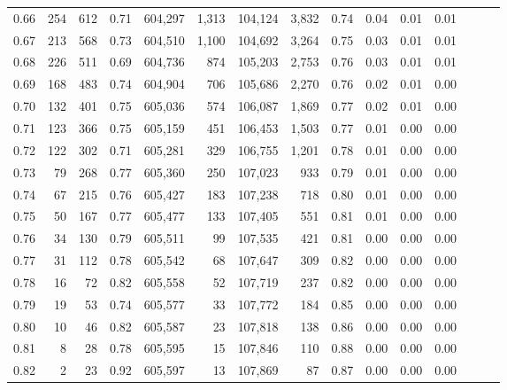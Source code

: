 \begin{tabular}{rrrrrrrrrrrrrrr}
0.66 &     254 &    612 &  0.71 &  604,297 &    1,313 &  104,124 &    3,832 &  0.74 &  0.04 &  0.01 &      0.01 \\
0.67 &     213 &    568 &  0.73 &  604,510 &    1,100 &  104,692 &    3,264 &  0.75 &  0.03 &  0.01 &      0.01 \\
0.68 &     226 &    511 &  0.69 &  604,736 &      874 &  105,203 &    2,753 &  0.76 &  0.03 &  0.01 &      0.01 \\
0.69 &     168 &    483 &  0.74 &  604,904 &      706 &  105,686 &    2,270 &  0.76 &  0.02 &  0.01 &      0.00 \\
0.70 &     132 &    401 &  0.75 &  605,036 &      574 &  106,087 &    1,869 &  0.77 &  0.02 &  0.01 &      0.00 \\
0.71 &     123 &    366 &  0.75 &  605,159 &      451 &  106,453 &    1,503 &  0.77 &  0.01 &  0.00 &      0.00 \\
0.72 &     122 &    302 &  0.71 &  605,281 &      329 &  106,755 &    1,201 &  0.78 &  0.01 &  0.00 &      0.00 \\
0.73 &      79 &    268 &  0.77 &  605,360 &      250 &  107,023 &      933 &  0.79 &  0.01 &  0.00 &      0.00 \\
0.74 &      67 &    215 &  0.76 &  605,427 &      183 &  107,238 &      718 &  0.80 &  0.01 &  0.00 &      0.00 \\
0.75 &      50 &    167 &  0.77 &  605,477 &      133 &  107,405 &      551 &  0.81 &  0.01 &  0.00 &      0.00 \\
0.76 &      34 &    130 &  0.79 &  605,511 &       99 &  107,535 &      421 &  0.81 &  0.00 &  0.00 &      0.00 \\
0.77 &      31 &    112 &  0.78 &  605,542 &       68 &  107,647 &      309 &  0.82 &  0.00 &  0.00 &      0.00 \\
0.78 &      16 &     72 &  0.82 &  605,558 &       52 &  107,719 &      237 &  0.82 &  0.00 &  0.00 &      0.00 \\
0.79 &      19 &     53 &  0.74 &  605,577 &       33 &  107,772 &      184 &  0.85 &  0.00 &  0.00 &      0.00 \\
0.80 &      10 &     46 &  0.82 &  605,587 &       23 &  107,818 &      138 &  0.86 &  0.00 &  0.00 &      0.00 \\
0.81 &       8 &     28 &  0.78 &  605,595 &       15 &  107,846 &      110 &  0.88 &  0.00 &  0.00 &      0.00 \\
0.82 &       2 &     23 &  0.92 &  605,597 &       13 &  107,869 &       87 &  0.87 &  0.00 &  0.00 &      0.00 \\

\end{tabular}
